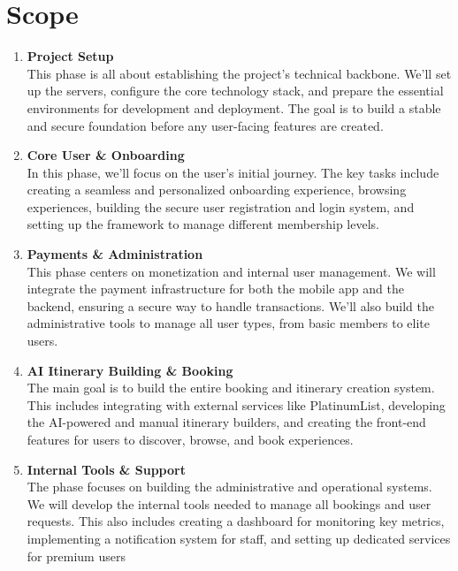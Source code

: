 \section{Scope}
\begin{enumerate}                                                                  
    \item \textbf{Project Setup} \\                                                
    This phase is all about establishing the project's technical backbone. We'll set up the servers, configure the core technology stack, and prepare the essential environments for development and deployment. The goal is to build a stable and secure foundation before any user-facing features are created.                                
                                                       
    \item \textbf{Core User \& Onboarding} \\                                      
    In this phase, we'll focus on the user's initial journey. The key tasks include creating a seamless and personalized onboarding experience, browsing experiences, building the secure user registration and login system, and setting up the framework to manage different membership levels. 

    \item \textbf{Payments \& Administration} \\                                      
    This phase centers on monetization and internal user management. We will integrate the payment infrastructure for both the mobile app and the backend, ensuring a secure way to handle transactions. We'll also build the administrative tools to manage all user types, from basic members to elite users.  

    \item \textbf{AI Itinerary Building \& Booking} \\                                      
    The main goal is to build the entire booking and itinerary creation system. This includes integrating with external services like PlatinumList, developing the AI-powered and manual itinerary builders, and creating the front-end features for users to discover, browse, and book experiences.

    \item \textbf{Internal Tools \& Support} \\                                      
    The phase focuses on building the administrative and operational systems. We will develop the internal tools needed to manage all bookings and user requests. This also includes creating a dashboard for monitoring key metrics, implementing a notification system for staff, and setting up dedicated services for premium users         
\end{enumerate}

